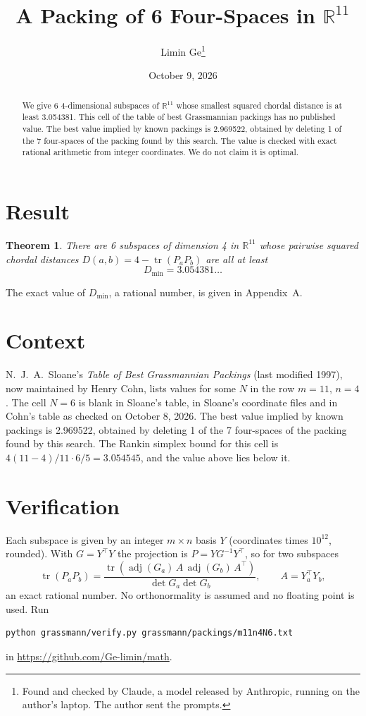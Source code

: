 \documentclass[11pt,a4paper]{article}
\title{A Packing of 6 Four-Spaces in $\mathbb{R}^{11}$}
\author{Limin Ge\thanks{Found and checked by Claude, a model released by Anthropic, running on the author's laptop. The author sent the prompts.}}
\date{October 9, 2026}
\newtheorem*{theorem}{Theorem}
\begin{document}
\maketitle
\begin{abstract}
We give 6 4-dimensional subspaces of $\mathbb{R}^{11}$ whose smallest squared chordal distance is at least 3.054381. This cell of the table of best Grassmannian packings has no published value. The best value implied by known packings is 2.969522, obtained by deleting 1 of the 7 four-spaces of the packing found by this search. The value is checked with exact rational arithmetic from integer coordinates. We do not claim it is optimal.
\end{abstract}

\section{Result}
\begin{theorem}
There are 6 subspaces of dimension 4 in $\mathbb{R}^{11}$ whose pairwise squared chordal distances $D(a,b) = 4 - \operatorname{tr}(P_aP_b)$ are all at least
\[ D_{\min} = 3.054381\ldots \]
\end{theorem}
The exact value of $D_{\min}$, a rational number, is given in Appendix~A.


\section{Context}
N.~J.~A.~Sloane's \emph{Table of Best Grassmannian Packings} (last modified 1997), now maintained by Henry Cohn, lists values for some $N$ in the row $m=11$, $n=4$. The cell $N=6$ is blank in Sloane's table, in Sloane's coordinate files and in Cohn's table as checked on October 8, 2026. The best value implied by known packings is 2.969522, obtained by deleting 1 of the 7 four-spaces of the packing found by this search. The Rankin simplex bound for this cell is $4(11-4)/11\cdot 6/5 = 3.054545$, and the value above lies below it.


\section{Verification}
Each subspace is given by an integer $m\times n$ basis $Y$ (coordinates times $10^{12}$, rounded). With $G=Y^\top Y$ the projection is $P=YG^{-1}Y^\top$, so for two subspaces
\[ \operatorname{tr}(P_aP_b)=\frac{\operatorname{tr}(\operatorname{adj}(G_a)\,A\,\operatorname{adj}(G_b)\,A^\top)}{\det G_a\det G_b},\qquad A=Y_a^\top Y_b, \]
an exact rational number. No orthonormality is assumed and no floating point is used. Run
\begin{verbatim}
python grassmann/verify.py grassmann/packings/m11n4N6.txt
\end{verbatim}
in \url{https://github.com/Ge-limin/math}.
\end{document}
